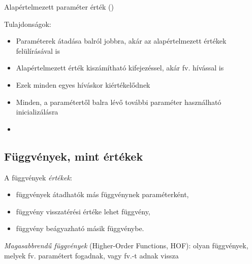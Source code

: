 \begin{frame}
    \begin{exampleblock}{Alapértelmezett paraméter érték ()}
        \small
        
    \end{exampleblock}
\end{frame}

\begin{frame}
    Tulajdonságok:
    \begin{itemize}
        \item Paraméterek átadása balról jobbra, akár az alapértelmezett értékek felülírásával is
        \item Alapértelmezett érték kiszámítható kifejezéssel, akár fv. hívással is
        \item Ezek minden egyes híváskor kiértékelődnek
        \item Minden, a paramétertől balra lévő további paraméter használható inicializálásra
        \item {}
    \end{itemize}
\end{frame}

\subsection{Függvények, mint értékek}

\begin{frame}
    A függvények \emph{értékek}:
    \begin{itemize}
        \item függvények átadhatók más függvénynek paraméterként,
        \item függvény visszatérési értéke lehet függvény,
        \item függvény beágyazható másik függvénybe.
    \end{itemize}
    \emph{Magasabbrendű függvények} (Higher-Order Functions, HOF): olyan függvények, melyek fv. paramétert fogadnak, vagy fv.-t adnak vissza
    \begin{exampleblock}{}
        \small
        
    \end{exampleblock}
\end{frame}

